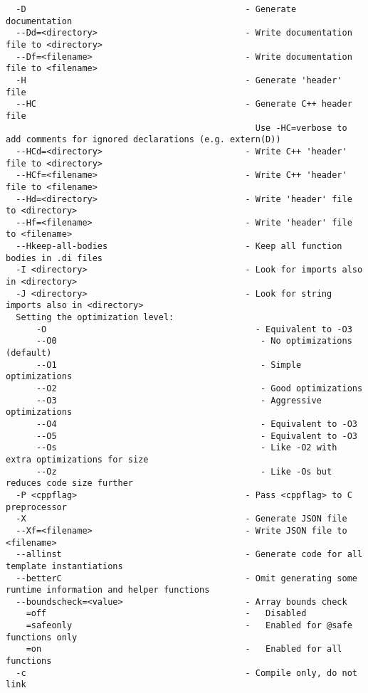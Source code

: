 \documentclass{studrep}
\begin{document}
\begin{verbatim}
  -D                                           - Generate documentation
  --Dd=<directory>                             - Write documentation file to <directory>
  --Df=<filename>                              - Write documentation file to <filename>
  -H                                           - Generate 'header' file
  --HC                                         - Generate C++ header file
                                                 Use -HC=verbose to add comments for ignored declarations (e.g. extern(D))
  --HCd=<directory>                            - Write C++ 'header' file to <directory>
  --HCf=<filename>                             - Write C++ 'header' file to <filename>
  --Hd=<directory>                             - Write 'header' file to <directory>
  --Hf=<filename>                              - Write 'header' file to <filename>
  --Hkeep-all-bodies                           - Keep all function bodies in .di files
  -I <directory>                               - Look for imports also in <directory>
  -J <directory>                               - Look for string imports also in <directory>
  Setting the optimization level:
      -O                                         - Equivalent to -O3
      --O0                                        - No optimizations (default)
      --O1                                        - Simple optimizations
      --O2                                        - Good optimizations
      --O3                                        - Aggressive optimizations
      --O4                                        - Equivalent to -O3
      --O5                                        - Equivalent to -O3
      --Os                                        - Like -O2 with extra optimizations for size
      --Oz                                        - Like -Os but reduces code size further
  -P <cppflag>                                 - Pass <cppflag> to C preprocessor
  -X                                           - Generate JSON file
  --Xf=<filename>                              - Write JSON file to <filename>
  --allinst                                    - Generate code for all template instantiations
  --betterC                                    - Omit generating some runtime information and helper functions
  --boundscheck=<value>                        - Array bounds check
    =off                                       -   Disabled
    =safeonly                                  -   Enabled for @safe functions only
    =on                                        -   Enabled for all functions
  -c                                           - Compile only, do not link

\end{verbatim}
\end{document}
